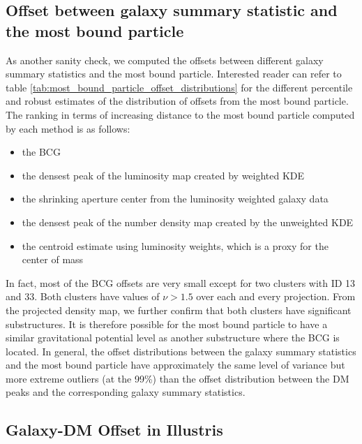 \subsection{Offset between galaxy summary statistic and the most bound particle}
As another sanity check, we computed the offsets between different galaxy summary
statistics and the most bound particle. 
Interested reader can refer to table
\ref{tab:most_bound_particle_offset_distributions} for the different
percentile and robust estimates of the distribution of offsets from the most bound 
particle. 
The ranking in terms of increasing distance 
to the most bound particle computed by each method is as follows:
\begin{itemize}
	\item the BCG 
	\item the densest peak of the luminosity map created by weighted KDE 
		\item the shrinking aperture center from the luminosity weighted galaxy data
		\item the densest peak of the number density map created by the unweighted KDE 
		\item the centroid estimate using luminosity weights, which is a proxy for the
			center of mass
\end{itemize}

In fact, most of the BCG offsets are very small except for two clusters with ID 13
and 33. Both clusters have  values of $\nu > 1.5 $ over each and every projection. 
From the projected density map, we further confirm that
both clusters have significant substructures. It is therefore possible for the
most bound particle to have a similar gravitational potential level as another 
substructure where the BCG is located. 
In general, the offset distributions between the galaxy summary statistics and
the most bound particle have approximately the same level of variance but more
extreme outliers (at the 99\%) than the
offset distribution between the DM peaks and the corresponding galaxy summary
statistics.

\subsection{Galaxy-DM Offset in Illustris}
